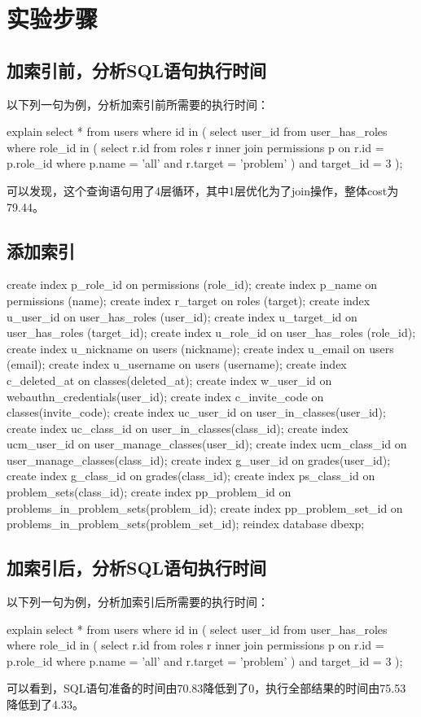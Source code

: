 \documentclass{ctexrep}
\begin{document}
\section{实验步骤}
\subsection{加索引前，分析SQL语句执行时间}
以下列一句为例，分析加索引前所需要的执行时间：
\begin{run}
    explain select * from users where id in (
        select user_id from user_has_roles where role_id in (
            select r.id from roles r 
            inner join permissions p on r.id = p.role_id 
            where p.name = 'all' and r.target = 'problem'
        ) and target_id = 3
    );
\end{run}
可以发现，这个查询语句用了4层循环，其中1层优化为了join操作，整体cost为79.44。

\subsection{添加索引}

\begin{run}
    create index p_role_id on permissions (role_id);
    create index p_name on permissions (name);
    create index r_target on roles (target);
    create index u_user_id on user_has_roles (user_id);
    create index u_target_id on user_has_roles (target_id);
    create index u_role_id on user_has_roles (role_id);
    create index u_nickname on users (nickname);
    create index u_email on users (email);
    create index u_username on users (username);
    create index c_deleted_at on classes(deleted_at);
    create index w_user_id on webauthn_credentials(user_id);
    create index c_invite_code on classes(invite_code);
    create index uc_user_id on user_in_classes(user_id);
    create index uc_class_id on user_in_classes(class_id);
    create index ucm_user_id on user_manage_classes(user_id);
    create index ucm_class_id on user_manage_classes(class_id);
    create index g_user_id on grades(user_id);
    create index g_class_id on grades(class_id);
    create index ps_class_id on problem_sets(class_id);
    create index pp_problem_id on problems_in_problem_sets(problem_id);
    create index pp_problem_set_id on problems_in_problem_sets(problem_set_id);
    reindex database dbexp;
\end{run}

\subsection{加索引后，分析SQL语句执行时间}
以下列一句为例，分析加索引后所需要的执行时间：
\begin{run}
    explain select * from users where id in (
        select user_id from user_has_roles where role_id in (
            select r.id from roles r 
            inner join permissions p on r.id = p.role_id 
            where p.name = 'all' and r.target = 'problem'
        ) and target_id = 3
    );
\end{run}
可以看到，SQL语句准备的时间由70.83降低到了0，执行全部结果的时间由75.53降低到了4.33。
\end{document}
